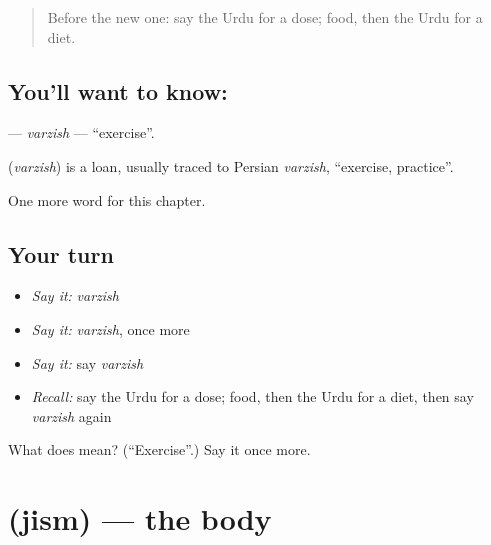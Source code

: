 \label{lesson:UR-C187-varzish}



\begin{quote}
Before the new one: say the Urdu for a dose; food, then the Urdu for a diet.
\end{quote}

\subsection*{You'll want to know: }
\textbf{} — \emph{varzish} — \textquotedblleft{}exercise\textquotedblright{}.

\begin{cousinweb}
\textbf{} (\emph{varzish}) is a loan, usually traced to Persian \emph{varzish}, \textquotedblleft{}exercise, practice\textquotedblright{}.
\end{cousinweb}

\begin{grammarlens}[title={What you've built}]
One more word for this chapter.
\end{grammarlens}

\subsection*{Your turn}
\begin{itemize}
\raggedright
  \item \emph{Say it:} \emph{varzish}
  \item \emph{Say it:} \emph{varzish}, once more
  \item \emph{Say it:} say \emph{varzish}
  \item \emph{Recall:} say the Urdu for a dose; food, then the Urdu for a diet, then say \emph{varzish} again
\end{itemize}

\begin{tcolorbox}[breakable,colback=teal!4,colframe=teal!35!black,title={Before you move on}]
What does  mean? (\textquotedblleft{}Exercise\textquotedblright{}.) Say it once more.
\end{tcolorbox}
\section[\texorpdfstring{\ur{جسم} (jism)}{جسم (jism)}]{ (jism) — the body}

\label{lesson:UR-C187-jism}



